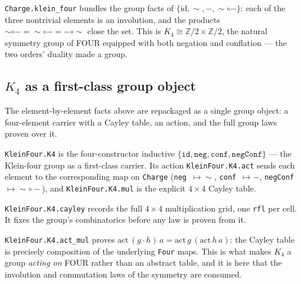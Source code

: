 \begin{theorem}\label{def:klein-four-symmetry}\leanok{}
\texttt{Charge.klein\_four} bundles the group facts of $\{\mathrm{id}, \sim, -, {\sim}\circ{-}\}$: each of the three nontrivial elements is an involution, and the products $\sim\circ- = {\sim}\circ{-} = -\circ\sim$ close the set. This is $K_4 \cong \mathbb{Z}/2 \times \mathbb{Z}/2$, the natural symmetry group of FOUR equipped with both negation and conflation --- the two orders' duality made a group.
\end{theorem}

\subsection{$K_4$ as a first-class group object}

The element-by-element facts above are repackaged as a single group object: a four-element carrier with a Cayley table, an action, and the full group laws proven over it.

\begin{definition}\label{def:k4-group}\leanok{}
\texttt{KleinFour.K4} is the four-constructor inductive $\{\texttt{id}, \texttt{neg}, \texttt{conf}, \texttt{negConf}\}$ --- the Klein-four group as a first-class carrier. Its action \texttt{KleinFour.K4.act} sends each element to the corresponding map on \texttt{Charge} (\texttt{neg}~$\mapsto\sim$, \texttt{conf}~$\mapsto-$, \texttt{negConf}~$\mapsto{\sim}\circ{-}$), and \texttt{KleinFour.K4.mul} is the explicit $4\times 4$ Cayley table.
\end{definition}

\begin{theorem}\label{thm:cayley}\leanok{}
\texttt{KleinFour.K4.cayley} records the full $4\times 4$ multiplication grid, one \texttt{rfl} per cell. It fixes the group's combinatorics before any law is proven from it.
\end{theorem}

\begin{theorem}\label{thm:act-mul}\leanok{}
\texttt{KleinFour.K4.act\_mul} proves $\mathrm{act}\,(g \cdot h)\,a = \mathrm{act}\,g\,(\mathrm{act}\,h\,a)$: the Cayley table is precisely composition of the underlying \texttt{Four} maps. This is what makes $K_4$ a group \emph{acting on} FOUR rather than an abstract table, and it is here that the involution and commutation laws of the symmetry are consumed.
\end{theorem}

